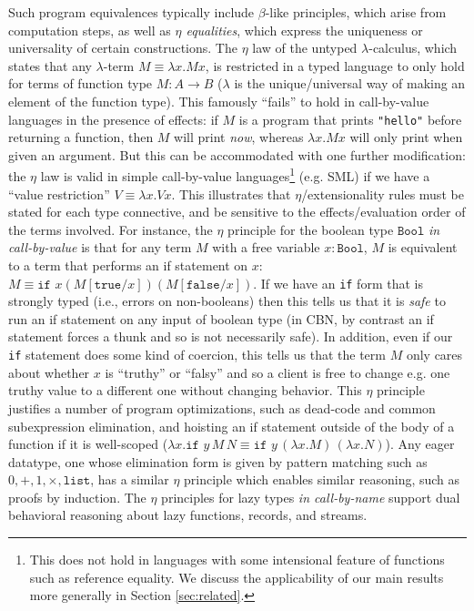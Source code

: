 \documentclass[acmsmall,screen,12pt]{acmart}
\newcommand{\kw}[1]{\texttt{#1}\,\,}
\begin{document}
Such program equivalences typically include $\beta$-like principles,
which arise from computation steps, as well as \emph{$\eta$ equalities},
which express the uniqueness or universality of certain constructions.
%
The $\eta$ law of the untyped $\lambda$-calculus, which
states that any $\lambda$-term $M \equiv \lambda x. M x$, is
restricted in a typed language to only hold for terms of function type $M
: A \to B$ ($\lambda$ is the unique/universal way of making an element
of the function type).  
%
This famously ``fails'' to hold in call-by-value languages in the
presence of effects: if $M$ is a program that prints \texttt{"hello"}
before returning a function, then $M$ will print \emph{now}, whereas
$\lambda x. M x$ will only print when given an argument. But this can be
accommodated with one further modification: the $\eta$ law is valid in
simple call-by-value languages\footnote{This does not hold in languages
  with some intensional feature of functions such as reference
  equality. We discuss the applicability of our main results more generally in Section \ref{sec:related}.} (e.g. SML) if we have a ``value
restriction'' $V \equiv \lambda x. V x$.
%
This illustrates that $\eta$/extensionality rules must be stated for
each type connective, and be sensitive to the effects/evaluation order
of the terms involved.
%
For instance, the $\eta$ principle for the boolean type $\texttt{Bool}$
\emph{in call-by-value} is that for any term $M$ with a free variable $x :
\texttt{Bool}$, $M$ is equivalent to a term that performs an if
statement on $x$: $M \equiv \kw{if} x (M[\texttt{true}/x])
(M[\texttt{false}/x])$.
%
If we have an \texttt{if} form that is strongly typed (i.e., errors on
non-booleans) then this tells us that it is \emph{safe} to run an if
statement on any input of boolean type (in CBN, by contrast an if
statement forces a thunk and so is not necessarily safe).
%
In addition, even if our \texttt{if} statement does some kind of
coercion, this tells us that the term $M$ only cares about whether $x$
is ``truthy'' or ``falsy'' and so a client is free to change e.g. one
truthy value to a different one without changing behavior.
%
This $\eta$ principle justifies a number of program optimizations,
such as dead-code and common subexpression elimination, and 
hoisting an if
statement outside of the body of a function if it is well-scoped
($\lambda x. \kw{if} y \, M \, N \equiv \kw {if} y \, (\lambda x.M) \, (\lambda x.N)$).
%
Any eager datatype, one whose elimination form is given by pattern
matching such as $0, +, 1, \times, \mathtt{list}$, has a similar $\eta$
principle which enables similar reasoning, such as proofs by induction.
%
The $\eta$ principles for lazy types \emph{in call-by-name} support dual
behavioral reasoning about lazy functions, records, and streams.
\end{document}
